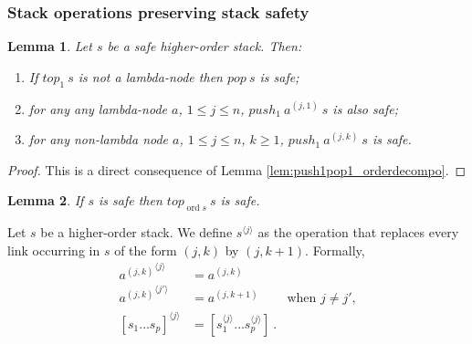 \documentclass{article}
\newcommand{\ord}{\mathop{\mathrm{ord}}}
\newtheorem{lemma}{Lemma}[section]
\theoremstyle{remark}
\theoremstyle{definition}
\begin{document}
\subsubsection{Stack operations preserving stack safety}
\begin{lemma}
\label{lem:push1pop1_preserves_safety} Let $s$ be a safe higher-order
stack. Then:
\begin{enumerate}
  \item If $top_1\ s$ is not a lambda-node then $pop\ s$ is safe;
  \item for any any lambda-node $a$, $1 \leq j \leq n$, $push_1\ a^{(j,1)}\ s$ is also safe;
  \item for any non-lambda node $a$, $1 \leq j \leq n$, $k \geq 1$, $push_1\ a^{(j,k)}\ s$ is safe.
\end{enumerate}
\end{lemma}
\begin{proof}
This is a direct consequence of Lemma
\ref{lem:push1pop1_orderdecompo}.
\end{proof}


\begin{lemma}
\label{lem:top_qsafe} If $s$ is safe then $top_{\ord{s}}~s$ is safe.
\end{lemma}


Let $s$ be a higher-order stack. We define $s^{\langle j \rangle}$ as the operation that replaces
every link occurring in $s$ of the form $(j,k)$ by $(j,k+1)$. Formally,
\begin{align*}
{a^{(j,k)}}^{\langle j \rangle} &= a^{(j,k)}   \\
{a^{(j,k)}}^{\langle j' \rangle} &= a^{(j,k+1)} &   \mbox{when $j\neq j'$,}\\
[s_1 \ldots s_p]^{\langle j \rangle} &= [s_1^{\langle j \rangle} \ldots s_p^{\langle j \rangle}] \ .
\end{align*}
\end{document}
